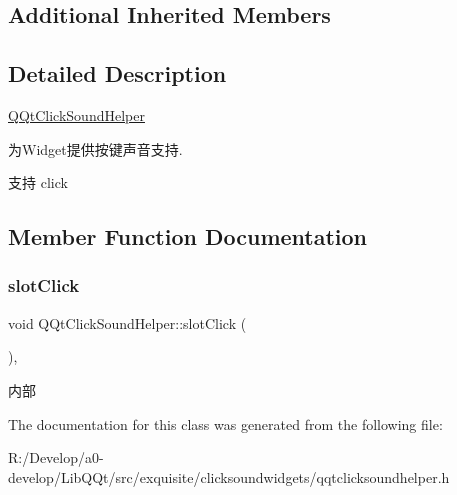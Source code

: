 \subsection*{Additional Inherited Members}


\subsection{Detailed Description}
\mbox{\hyperlink{class_q_qt_click_sound_helper}{Q\+Qt\+Click\+Sound\+Helper}}

为\+Widget提供按键声音支持.

支持 click 

\subsection{Member Function Documentation}
\mbox{\label{class_q_qt_click_sound_helper_a3bddaf8bb91f01bc5e14a60ec0683ec8}} 
\subsubsection{\texorpdfstring{slot\+Click}{slotClick}}
{\footnotesize\ttfamily void Q\+Qt\+Click\+Sound\+Helper\+::slot\+Click (\begin{DoxyParamCaption}{ }\end{DoxyParamCaption})\hspace{0.3cm}{\ttfamily [inline]}, {\ttfamily [slot]}}

内部 

The documentation for this class was generated from the following file\+:\begin{DoxyCompactItemize}
\item 
R\+:/\+Develop/a0-\/develop/\+Lib\+Q\+Qt/src/exquisite/clicksoundwidgets/qqtclicksoundhelper.\+h\end{DoxyCompactItemize}

